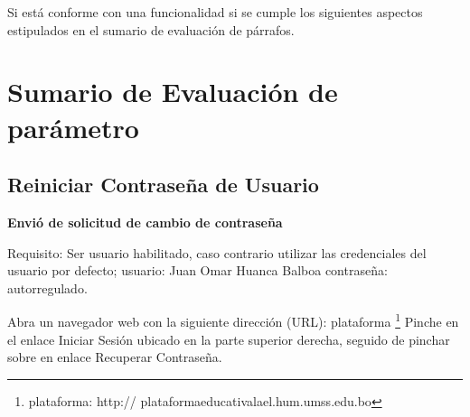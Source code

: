 Si est\'{a} conforme con una funcionalidad si se cumple los siguientes aspectos
estipulados en el sumario de evaluaci\'{o}n de p\'{a}rrafos.

\section{Sumario de Evaluaci\'{o}n de par\'{a}metro}

\subsection{Reiniciar Contrase\~{n}a de Usuario}

\textbf{Envi\'{o} de solicitud de cambio de contrase\~{n}a}

Requisito: Ser usuario habilitado, caso contrario utilizar las credenciales del
usuario por defecto; usuario: Juan Omar Huanca Balboa contrase\~{n}a: autorregulado.

Abra un navegador web con la siguiente direcci\'{o}n (URL): plataforma 
\footnote{plataforma: http:// plataformaeducativalael.hum.umss.edu.bo} Pinche en
el enlace Iniciar Sesi\'{o}n ubicado en la parte superior derecha, seguido de
pinchar sobre en enlace Recuperar Contrase\~{n}a.

